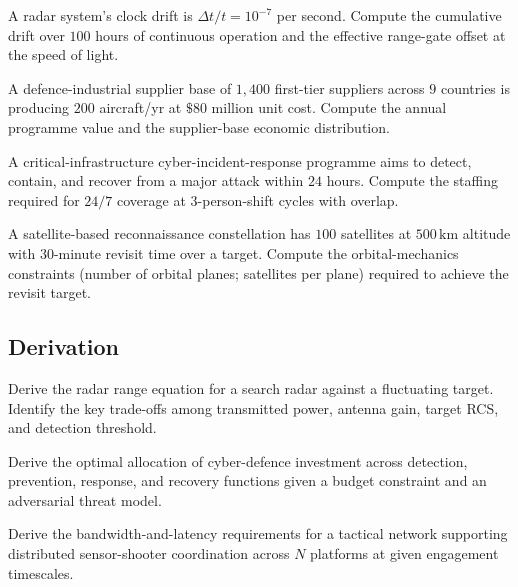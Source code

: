 \begin{exercise}
A radar system's clock drift is $\Delta t/t = 10^{-7}$ per second. Compute the cumulative drift over $100$ hours of continuous operation and the effective range-gate offset at the speed of light.
\end{exercise}

\begin{exercise}
A defence-industrial supplier base of $1{,}400$ first-tier suppliers across $9$ countries is producing $200$ aircraft/yr at $\$80$ million unit cost. Compute the annual programme value and the supplier-base economic distribution.
\end{exercise}

\begin{exercise}
A critical-infrastructure cyber-incident-response programme aims to detect, contain, and recover from a major attack within $24$ hours. Compute the staffing required for $24/7$ coverage at $3$-person-shift cycles with overlap.
\end{exercise}

\begin{exercise}
A satellite-based reconnaissance constellation has $100$ satellites at $500\,\text{km}$ altitude with $30$-minute revisit time over a target. Compute the orbital-mechanics constraints (number of orbital planes; satellites per plane) required to achieve the revisit target.
\end{exercise}

\subsection*{Derivation}

\begin{exercise}
Derive the radar range equation for a search radar against a fluctuating target. Identify the key trade-offs among transmitted power, antenna gain, target RCS, and detection threshold.
\end{exercise}

\begin{exercise}
Derive the optimal allocation of cyber-defence investment across detection, prevention, response, and recovery functions given a budget constraint and an adversarial threat model.
\end{exercise}

\begin{exercise}
Derive the bandwidth-and-latency requirements for a tactical network supporting distributed sensor-shooter coordination across $N$ platforms at given engagement timescales.
\end{exercise}

